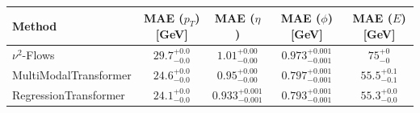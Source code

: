     \begin{tabular}{lcccc}
        \toprule
        Method & MAE ($p_T$) [GeV] & MAE ($\eta$) & MAE ($\phi$) [GeV] & MAE ($E$) [GeV] \\
        \midrule
        $\nu^2$-Flows & $29.7_{-0.0}^{+0.0}$ & $1.01_{-0.00}^{+0.00}$ & $0.973_{-0.001}^{+0.001}$ & $75_{-0}^{+0}$ \\
        MultiModalTransformer & $24.6_{-0.0}^{+0.0}$ & $0.95_{-0.00}^{+0.00}$ & $0.797_{-0.001}^{+0.001}$ & $55.5_{-0.1}^{+0.1}$ \\
        RegressionTransformer & $24.1_{-0.0}^{+0.0}$ & $0.933_{-0.001}^{+0.001}$ & $0.793_{-0.001}^{+0.001}$ & $55.3_{-0.0}^{+0.0}$ \\
        \bottomrule
    \end{tabular}